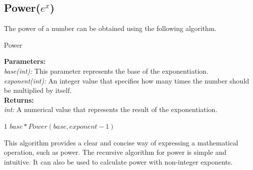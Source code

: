 \subsection{Power($e^x$)}
  \begin{flushleft}
    The power of a number can be obtained using the following algorithm.
  \end{flushleft}

  \begin{algorithm}
    \caption{Power}\label{exp}
      \begin{tabbing}
        \textbf{Parameters:}\\
          \hspace{1em}\textit{base(int):} This parameter represents the base of the exponentiation.\\
          \hspace{1em}\textit{exponent(int):} An integer value that specifies how many times the number should be multiplied by itself.\\
          
        \textbf{Returns:}\\
          \hspace{1em}\textit{int:}  A numerical value that represents the result of the exponentiation.
      \end{tabbing}
      \vspace{1 em}
      \begin{algorithmic}
                \State \Return $1$
            \Else
                \State \Return $base * Power(base, exponent - 1)$
            \EndIf
        \EndProcedure
      \end{algorithmic}    
  \end{algorithm}
  \begin{flushleft}
    This algorithm provides a clear and concise way of expressing a mathematical operation, such as power. The recursive algorithm for power is simple and intuitive. 
    It can also be used to calculate power with non-integer exponents.
  \end{flushleft}
\pagebreak